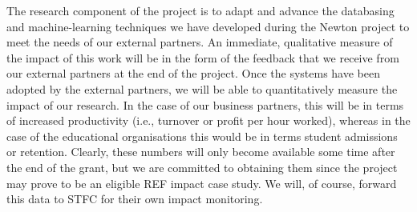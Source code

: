 \documentclass[11pt]{article}
\begin{document}
\vspace{2mm}
\noindent
The research component of the project is to adapt and advance the databasing and machine-learning techniques we have developed during the Newton project to meet the needs of our external partners. An immediate, qualitative measure of the impact of this work will be in the form of the feedback that we receive from our external partners at the end of the project. Once the systems have been adopted by the external partners, we will be able to quantitatively measure the impact of our research. In the case of our business partners, this will be in terms of increased productivity (i.e., turnover or profit per hour worked), whereas in the case of the educational organisations this would be in terms student admissions or retention. Clearly, these numbers will only become available some time after the end of the grant, but we are committed to obtaining them since the project may prove to be an eligible REF impact case study. We will, of course, forward this data to STFC for their own impact monitoring.
\end{document}

